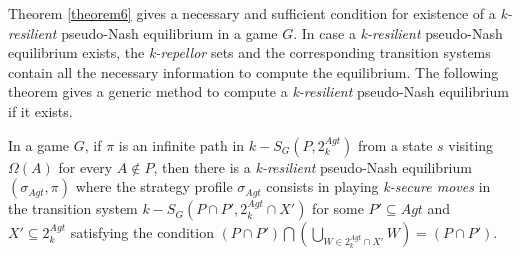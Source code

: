 Theorem \ref{theorem6} gives a necessary and sufficient condition for existence of a \textit{k-resilient} pseudo-Nash equilibrium in a game $G$. In case a \textit{k-resilient} pseudo-Nash equilibrium exists, the \textit{k-repellor} sets and the corresponding transition systems contain all the necessary information to compute the equilibrium. The following theorem gives a generic method to compute a \textit{k-resilient} pseudo-Nash equilibrium if it exists.

\begin{theorem}
\label{theorem7}
In a game $G$, if $\pi$ is an infinite path in $k-S_{G}(P, 2^{Agt}_{k})$ from a state $s$ visiting $\Omega(A)$ for every $A \notin P$, then there is a \textit{k-resilient} pseudo-Nash equilibrium $(\sigma_{Agt}, \pi)$ where the strategy profile $\sigma_{Agt}$ consists in playing \textit{k-secure moves} in the transition system $k-S_{G}(P \cap P', 2^{Agt}_{k} \cap X')$ for some $P' \subseteq Agt$ and $X' \subseteq 2^{Agt}_{k}$ satisfying the condition $(P \cap P') \bigcap \left( \bigcup \limits_{W \in 2^{Agt}_{k} \cap X'}W \right) = (P \cap P')$.
\end{theorem}


